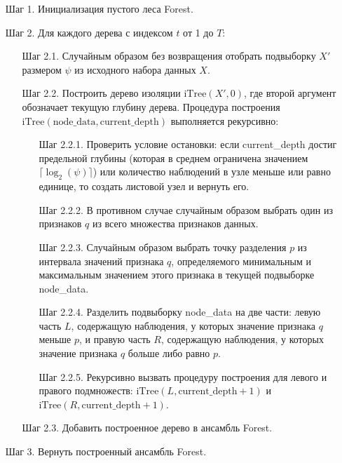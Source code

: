 \documentclass[14pt,a4paper]{extarticle}
\begin{document}
\begin{itemize}
\item[Шаг 1.] Инициализация пустого леса Forest.
\item[Шаг 2.] Для каждого дерева с индексом $t$ от 1 до $T$:
\begin{itemize}
    \item[Шаг 2.1.] Случайным образом без возвращения отобрать подвыборку $X'$ размером $\psi$ из исходного 
    набора данных $X$.
    \item[Шаг 2.2.] Построить дерево изоляции $\text{iTree}(X', 0)$, где второй аргумент обозначает текущую 
    глубину дерева. Процедура построения $\text{iTree}(\text{node\_data}, \text{current\_depth})$ выполняется 
    рекурсивно:
    \begin{itemize}
        \item[Шаг 2.2.1.] Проверить условие остановки: если current\_depth достиг предельной глубины 
        (которая в среднем ограничена значением $\lceil \log_{2}(\psi) \rceil$) или количество наблюдений 
        в узле меньше или равно единице, то создать листовой узел и вернуть его.
        \item[Шаг 2.2.2.] В противном случае случайным образом выбрать один из признаков $q$ из всего 
        множества признаков данных.
        \item[Шаг 2.2.3.] Случайным образом выбрать точку разделения $p$ из интервала значений признака 
        $q$, определяемого минимальным и максимальным значением этого признака в текущей подвыборке 
        node\_data.
        \item[Шаг 2.2.4.] Разделить подвыборку node\_data на две части: левую часть $L$, содержащую 
        наблюдения, у которых значение признака $q$ меньше $p$, и правую часть $R$, содержащую наблюдения, 
        у которых значение признака $q$ больше либо равно $p$.
        \item[Шаг 2.2.5.] Рекурсивно вызвать процедуру построения для левого и правого подмножеств: 
        $\text{iTree}(L, \text{current\_depth} + 1)$ и $\text{iTree}(R, \text{current\_depth} + 1)$.
    \end{itemize}
    \item[Шаг 2.3.] Добавить построенное дерево в ансамбль Forest.
\end{itemize}
\item[Шаг 3.] Вернуть построенный ансамбль Forest.
\end{itemize}
\end{document}
